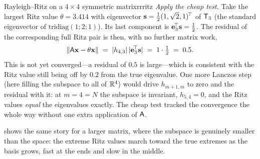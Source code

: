 \begin{workedexample}{Rayleigh--Ritz on a $4\times4$ symmetric matrix}{rrritz}
\smallskip
\emph{Apply the cheap test.} Take the largest Ritz value $\theta = 3.414$ with eigenvector
$\mathbf{s} = \tfrac12(1, \sqrt2, 1)^{\!\top}$ of $\mathsf{T}_3$ (the standard eigenvector of
$\mathrm{tridiag}(1;2;1)$). Its last component is $\mathbf{e}_3^{\!\top}\mathbf{s} = \tfrac12$. The
residual of the corresponding full Ritz pair is then, with no further matrix work,
\[
  \lVert\mathsf{A}\mathbf{x} - \theta\mathbf{x}\rVert \;=\; \lvert h_{4,3}\rvert\,\lvert\mathbf{e}_3^{\!\top}\mathbf{s}\rvert
    \;=\; 1 \cdot \tfrac12 \;=\; 0.5.
\]
This is not yet converged---a residual of $0.5$ is large---which is consistent with the
Ritz value still being off by $0.2$ from the true eigenvalue. One more Lanczos step (here
filling the subspace to all of $\mathbb{R}^4$) would drive $h_{m+1,m}$ to zero and the residual
with it: at $m = 4 = N$ the subspace is invariant, $h_{5,4} = 0$, and the Ritz values
\emph{equal} the eigenvalues exactly. The cheap test tracked the convergence the whole way
without one extra application of $\mathsf{A}$.
\end{workedexample}

 shows the same story for a larger matrix, where the subspace is
genuinely smaller than the space: the extreme Ritz values march toward the true extremes as
the basis grows, fast at the ends and slow in the middle.

